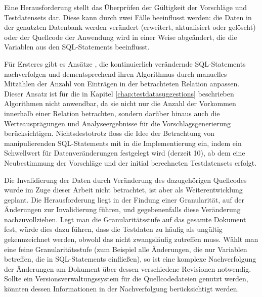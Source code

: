 Eine Herausforderung stellt das Überprüfen der Gültigkeit der Vorschläge und Testdatensets dar.
Diese kann durch zwei Fälle beeinflusst werden: die Daten in der genutzten Datenbank werden verändert (erweitert, aktualisiert oder gelöscht) oder der Quellcode der Anwendung wird in einer Weise abgeändert, die die Variablen aus den SQL-Statements beeinflusst.

Für Ersteres gibt es Ansätze \cite{DBLP:conf/dasfaa/HarangsriSN97}, die kontinuierlich verändernde SQL-Statements nachverfolgen und dementsprechend ihren Algorithmus durch manuelles Mitzählen der Anzahl von Einträgen in der betrachteten Relation anpassen.
Dieser Ansatz ist für die in Kapitel \ref{chap:testdatasuggestions} beschrieben Algorithmen nicht anwendbar, da sie nicht nur die Anzahl der Vorkommen innerhalb einer Relation betrachten, sondern darüber hinaus auch die Werteausprägungen und Analyseergebnisse für die Vorschlagsgenerierung berücksichtigen.
Nichtsdestotrotz floss die Idee der Betrachtung von manipulierenden SQL-Statements mit in die Implementierung ein, indem ein Schwellwert für Datenveränderungen festgelegt wird (derzeit 10), ab dem eine Neubestimmung der Vorschläge und der initial berechneten Testdatensets erfolgt.

Die Invalidierung der Daten durch Veränderung des dazugehörigen Quellcodes wurde im Zuge dieser Arbeit nicht betrachtet, ist aber als Weiterentwicklung geplant.
Die Herausforderung liegt in der Findung einer Granularität, auf der Änderungen zur Invalidierung führen, und gegebenenfalls diese Veränderung nachzuvollziehen.
Legt man die Granularitätsstufe auf das gesamte Dokument fest, würde dies dazu führen, dass die Testdaten zu häufig als ungültig gekennzeichnet werden, obwohl das nicht zwangsläufig zutreffen muss.
Wählt man eine feine Granularitätsstufe (zum Beispiel alle Änderungen, die nur Variablen betreffen, die in SQL-Statements einfließen), so ist eine komplexe Nachverfolgung der Änderungen am Dokument über dessen verschiedene Revisionen notwendig.
Sollte ein Versionsverwaltungssystem für die Quellcodedateien genutzt werden, könnten dessen Informationen in der Nachverfolgung berücksichtigt werden.

